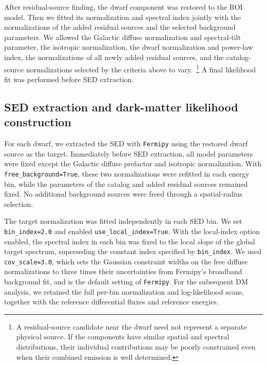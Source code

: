 \documentclass[superscriptaddress,
showpacs,preprintnumbers,nofootinbib,eqsecnum,amsmath,amssymb,aps,11pt, groupedaddress, floatfix]{revtex4-2}
\begin{document}
After residual-source finding, the dwarf component was restored to the ROI model. 
Then we fitted its normalization and spectral index jointly with the normalizations of the added residual sources and the selected background parameters.
We allowed the Galactic diffuse normalization and spectral-tilt parameter, the isotropic normalization, the dwarf normalization and power-law index, the normalizations of all newly added residual sources, and the catalog-source normalizations selected by the criteria above to vary.~\footnote{A residual-source candidate near the dwarf need not represent a separate physical source. If the components have similar spatial and spectral distributions, their individual contributions may be poorly constrained even when their combined emission is well determined.} 
A final likelihood fit was performed before SED extraction.



\subsection{SED extraction and dark-matter likelihood construction}
\label{subsec:sed-extraction}


For each dwarf, we extracted the SED with \texttt{Fermipy} using the
restored dwarf source as the target. 
Immediately before SED
extraction, all model parameters were fixed except the Galactic
diffuse prefactor and isotropic normalization. 
With
\texttt{free\_background=True}, these two normalizations were
refitted in each energy bin, while the parameters of the catalog
and added residual sources remained fixed. 
No additional
background sources were freed through a spatial-radius selection.

The target normalization was fitted independently in each SED
bin. 
We set \texttt{bin\_index=2.0} and enabled
\texttt{use\_local\_index=True}. With the local-index option
enabled, the spectral index in each bin was fixed to the local
slope of the global target spectrum, superseding the constant
index specified by \texttt{bin\_index}. We used
\texttt{cov\_scale=3.0}, which sets the Gaussian constraint widths
on the free diffuse normalizations to three times their
uncertainties from Fermipy's broadband background fit, and is the default setting of \texttt{Fermipy}.
For the subsequent DM analysis, we retained the full per-bin
normalization and log-likelihood scans, together with the
reference differential fluxes and reference energies.
\end{document}
